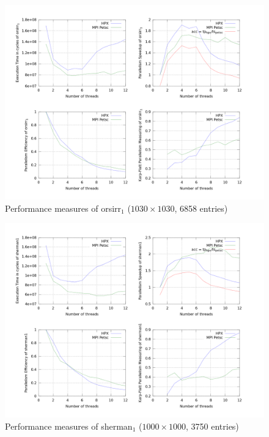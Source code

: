 \documentclass{llncs}
\begin{document}
\begin{figure}[h!]
\begin{center}
\includegraphics[scale=0.25]{Images/orsirr1.png}
\end{center}
\caption{Performance measures of orsirr$_1$ ($1030\times1030$, 6858 entries)}
\label{orsirr_1}
\end{figure}

\begin{figure}[h!]
\begin{center}
\includegraphics[scale=0.25]{Images/sherman1.png}
\end{center}
\caption{Performance measures of sherman$_1$ ($1000\times1000$, 3750 entries)}
\label{sherman1}
\end{figure}
\end{document}
